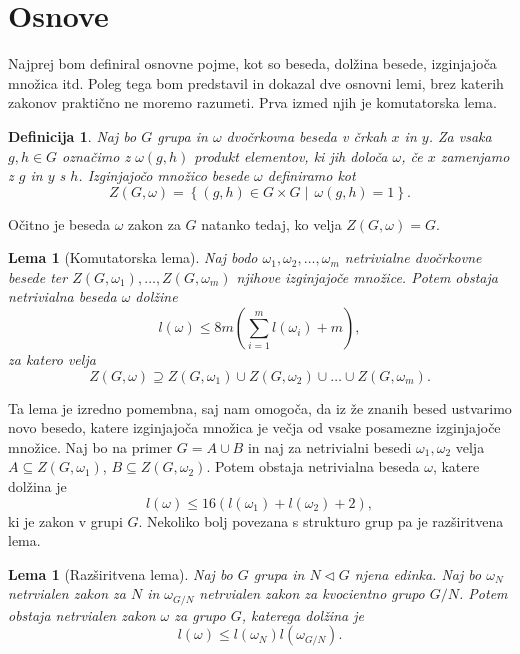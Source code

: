 \documentclass[12pt,a4paper]{article}
\newcounter{theoremcounter}[section] %
\newtheorem{lema}[theoremcounter]{Lema}
\newtheorem{definicija}[theoremcounter]{Definicija}
\begin{document}
\section{Osnove}

Najprej bom definiral osnovne pojme, kot so beseda, dolžina besede, izginjajoča množica itd. Poleg tega bom predstavil in dokazal dve osnovni lemi, brez katerih zakonov praktično ne moremo razumeti. Prva izmed njih je komutatorska lema.
\begin{definicija}
Naj bo $G$ grupa in $\omega$ dvočrkovna beseda v črkah $x$ in $y$. Za vsaka $g, h \in G$ označimo z $\omega(g,h)$ produkt elementov, ki jih določa $\omega$,
če $x$ zamenjamo z $g$ in $y$ s $h$. Izginjajočo množico besede $\omega$ definiramo kot \begin{equation*}
Z(G, \omega) = \left\{ (g,h) \in G \times G  \middle|\,  \omega(g,h) = 1 \right\}. 
\end{equation*}
\end{definicija}

\noindent
Očitno je beseda $\omega$ zakon za $G$ natanko tedaj, ko velja $Z(G, \omega) = G$.

\begin{lema}[Komutatorska lema]
    Naj bodo $\omega_1, \omega_2, \ldots, \omega_m$ netrivialne dvočrkovne besede ter $Z(G, \omega_1), \ldots, Z(G, \omega_m)$ njihove izginjajoče množice. Potem obstaja netrivialna beseda $\omega$ dolžine \begin{equation*}
    l(\omega) \le  8m\left(\sum_{i=1}^{m} l\left(\omega_i\right) + m\right),
    \end{equation*}  
    za katero velja \begin{equation*}
    Z(G, \omega) \supseteq Z(G, \omega_1) \cup  Z(G, \omega_2) \cup \ldots \cup Z(G, \omega_m).
    \end{equation*}  
    \end{lema}
    
\noindent    
Ta lema je izredno pomembna, saj nam omogoča, da iz že znanih besed ustvarimo novo besedo, katere izginjajoča množica je večja od vsake posamezne izginjajoče množice. Naj bo na primer $G = A \cup B$ in naj za netrivialni besedi $\omega_1, \omega_2$ velja $A \subseteq Z(G, \omega_1)$, $B \subseteq Z(G, \omega_2)$. Potem obstaja netrivialna beseda $\omega$, katere dolžina je \begin{equation*}
l(\omega) \le  16 (l(\omega_1) + l(\omega_2) + 2),
\end{equation*}  
ki je zakon v grupi $G$.
Nekoliko bolj povezana s strukturo grup pa je razširitvena lema.  \begin{lema}[Razširitvena lema]
    Naj bo $G$ grupa in $N \triangleleft G$ njena edinka. Naj bo $\omega_N$ netrvialen zakon za $N$ in
    $\omega_{G/N}$ netrvialen zakon za kvocientno grupo $G/N$. Potem obstaja netrvialen zakon $\omega$ za grupo $G$, katerega dolžina je \begin{equation*}
    l(\omega) \le  l(\omega_N)l(\omega_{G/N}).
    \end{equation*}  
    \end{lema}
\end{document}
